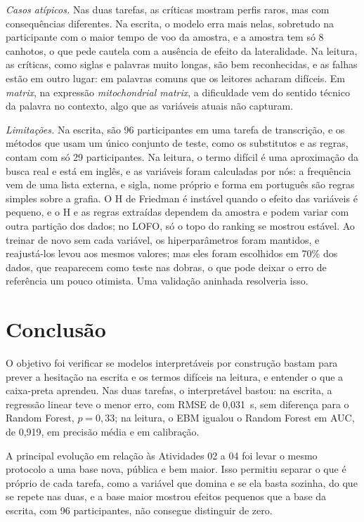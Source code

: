 \documentclass[conference]{IEEEtran}
\newcommand{\RF}{Random Forest}
\begin{document}
\emph{Casos atípicos.} Nas duas tarefas, as críticas mostram perfis raros, mas
com consequências diferentes. Na escrita, o modelo erra mais nelas, sobretudo
na participante com o maior tempo de voo da amostra, e a amostra tem só 8
canhotos, o que pede cautela com a ausência de efeito da lateralidade. Na
leitura, as críticas, como siglas e palavras muito longas, são bem
reconhecidas, e as falhas estão em outro lugar: em palavras comuns que os
leitores acharam difíceis. Em \emph{matrix}, na expressão \emph{mitochondrial
matrix}, a dificuldade vem do sentido técnico da palavra no contexto, algo que
as variáveis atuais não capturam.

\emph{Limitações.} Na escrita, são 96 participantes em uma tarefa de
transcrição, e os métodos que usam um único conjunto de teste, como os
substitutos e as regras, contam com só 29 participantes. Na leitura, o termo
difícil é uma aproximação da busca real e está em inglês, e as variáveis foram
calculadas por nós: a frequência vem de uma lista externa, e sigla, nome
próprio e forma em português são regras simples sobre a grafia. O H de Friedman
é instável quando o efeito das variáveis é pequeno, e o H e as regras extraídas
dependem da amostra e podem variar com outra partição dos dados; no LOFO, só o
topo do ranking se mostrou estável. Ao treinar de novo sem cada variável, os
hiperparâmetros foram mantidos, e reajustá-los levou aos mesmos valores; mas
eles foram escolhidos em 70\% dos dados, que reaparecem como teste nas dobras,
o que pode deixar o erro de referência um pouco otimista. Uma validação
aninhada resolveria isso.

\section{Conclusão}

O objetivo foi verificar se modelos interpretáveis por construção bastam para
prever a hesitação na escrita e os termos difíceis na leitura, e entender o que
a caixa-preta aprendeu. Nas duas tarefas, o interpretável bastou: na escrita, a
regressão linear teve o menor erro, com RMSE de 0,031~s, sem diferença para o
\RF{}, $p = 0,33$; na leitura, o EBM igualou o \RF{} em AUC, de 0,919, em
precisão média e em calibração.

A principal evolução em relação às Atividades 02 a 04 foi levar o mesmo
protocolo a uma base nova, pública e bem maior. Isso permitiu separar o que é
próprio de cada tarefa, como a variável que domina e se ela basta sozinha, do
que se repete nas duas, e a base maior mostrou efeitos pequenos que a base da
escrita, com 96 participantes, não consegue distinguir de zero.
\end{document}
